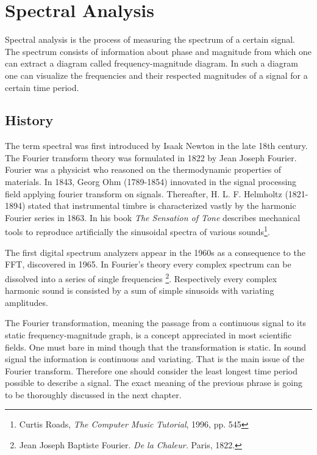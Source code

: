 \section{Spectral Analysis}
	
Spectral analysis is the process of measuring the spectrum of a certain signal. The spectrum consists of information about phase and magnitude from which one can extract a diagram called frequency-magnitude diagram. In such a diagram one can visualize the frequencies and their respected magnitudes of a signal for a certain time period.




	\subsection{History}

	The term spectral was first introduced by Isaak Newton in the late 18th century. The Fourier transform theory was formulated in 1822 by Jean Joseph Fourier. Fourier was a physicist who reasoned on the thermodynamic properties of materials. In 1843, Georg Ohm (1789-1854) innovated in the signal processing field applying fourier transform on signals. Thereafter, H. L. F. Helmholtz (1821-1894) stated that instrumental timbre is characterized vastly by the harmonic Fourier series in 1863. In his book \textit{The Sensation of Tone} describes mechanical tools to reproduce artificially the sinusoidal spectra of various sounds\footnote{Curtis Roads, \textit{The Computer Music Tutorial}, 1996, pp. 545 \nocite{Roads:1996:CMT:525484}}. 

	The first digital spectrum analyzers appear in the 1960s as a consequence to the FFT, discovered in 1965.  In Fourier's theory every complex spectrum can be dissolved into a series of single frequencies \footnote{Jean Joseph Baptiste Fourier. \textit{De la Chaleur.} Paris, 1822.}. Respectively every complex harmonic sound is consisted by a sum of simple sinusoids with variating amplitudes.

	The Fourier transformation, meaning the passage from a continuous signal to its static frequency-magnitude graph, is a concept appreciated in most scientific fields. One must bare in mind though that the transformation is static. In sound signal the information is continuous and variating. That is the main issue of the Fourier transform. Therefore one should consider the least longest time period possible to describe a signal. The exact meaning of the previous phrase is going to be thoroughly discussed in the next chapter.

